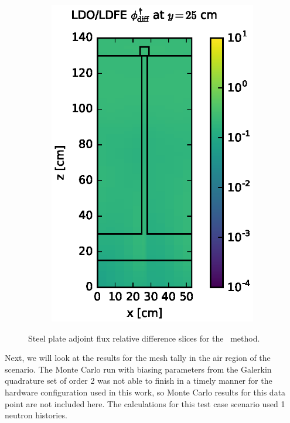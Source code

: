 \begin{figure}[!htb]
\begin{subfigure}{0.4\textwidth}
\includegraphics[max height=0.445\textheight]
{img/steel-plots/fwc-adj/flux-diff-rel-ldfe01.eps}
\end{subfigure}
\caption{Steel plate adjoint flux relative difference slices for the \fwc\
         method.}
\label{steel-fwc-adj-diff-rel}
\end{figure}

\clearpage
Next, we will look at the results for the mesh tally in the air region of the 
scenario. The Monte Carlo run with biasing parameters from the Galerkin quadrature 
set of order 2 was not able to finish in a timely manner for the hardware
configuration used in this work, so Monte Carlo results for this data point are not
included here. The calculations for this test case scenario used 1\E{9} neutron histories.

